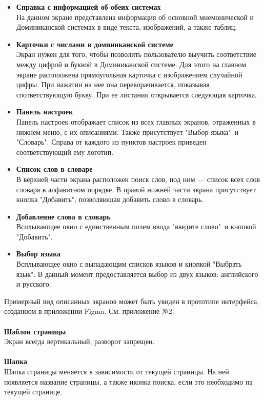 \documentclass[draft]{article}
\begin{document}
\begin{itemize}
\item \textbf{Справка с информацией об обеих системах}\\
На данном экране представлена информация об основной мнемонической и Доминиканской системах в виде текста, изображений, а также таблиц.
\item \textbf{Карточки с числами в доминиканской системе}\\
Экран нужен для того, чтобы позволить пользователю выучить соответствие между цифрой и буквой в Доминиканской системе. Для этого на главном экране расположена прямоугольная карточка с изображением случайной цифры. При нажатии на нее она переворачивается, показывая соответствующую букву. При ее листании открывается следующая карточка.
\item \textbf{Панель настроек}\\
Панель настроек отображает список из всех главных экранов, отраженных в нижнем меню, с их описаниями. Также присутствует "{}Выбор языка"{}\ и "{}Словарь"{}. Справа от каждого из пунктов настроек приведен соответствующий ему логотип.
\item \textbf{Список слов в словаре}\\
В верхней части экрана расположен поиск слов, под ним — список всех слов словаря в алфавитном порядке. В правой нижней части экрана присутствует кнопка "{}Добавить"{}, позволяющая добавить слово в словарь.
\item \textbf{Добавление слова в словарь}\\
Всплывающее окно с единственным полем ввода "{}введите слово"{}\ и кнопкой "{}Добавить"{}.
\item \textbf{Выбор языка}\\
Всплывающее окно с выпадающим списков языков и кнопкой "{}Выбрать язык"{}. В данный момент предоставляется выбор из двух языков: английского и русского.
\end{itemize}
Примерный вид описанных экранов может быть увиден в прототипе интерфейса, созданном в приложении Figma. См. приложение №2.\\
~\\
\textbf{Шаблон страницы}\\
Экран всегда вертикальный, разворот запрещен.\\
~\\
\textbf{Шапка}\\
Шапка страницы меняется в зависимости от текущей страницы. На ней появляется название страницы, а также иконка поиска, если это необходимо на текущей странице.\\
\end{document}
